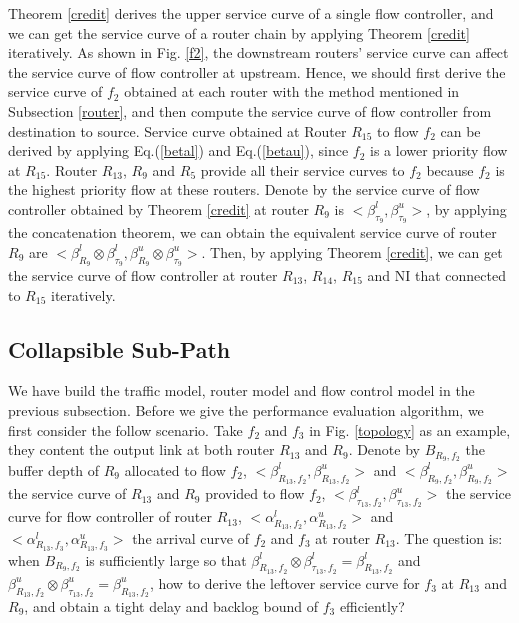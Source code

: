 \documentclass[10pt,journal]{IEEEtran}
\begin{document}
Theorem \ref{credit} derives the upper service curve of a single flow controller, and we can get the service curve of a router chain by applying Theorem
\ref{credit} iteratively. As shown in Fig. \ref{f2}, the downstream routers' service curve can affect the service curve of flow controller at upstream. Hence, we should first derive the service curve of $f_2$ obtained at each router with the method mentioned in Subsection \ref{router}, and then compute the service curve of flow controller from destination to source. Service curve obtained at Router $R_{15}$ to flow $f_2$ can be derived by applying Eq.(\ref{betal}) and Eq.(\ref{betau}), since $f_2$ is a lower priority flow at $R_{15}$. Router $R_{13}$, $R_{9}$ and $R_{5}$ provide all their service curves to $f_2$ because $f_2$ is the highest priority flow at these routers. Denote by the service curve of flow controller obtained by Theorem \ref{credit} at router $R_{9}$ is $<\beta_{\tau_9}^l,\beta_{\tau_9}^u>$, by applying the concatenation theorem, we can obtain the equivalent service curve of router $R_{9}$ are $<\beta_{R_9}^l\otimes\beta_{\tau_9}^l,\beta_{R_9}^u\otimes\beta_{\tau_9}^u>$. Then, by applying Theorem \ref{credit}, we can get the service curve of flow controller at router $R_{13}$, $R_{14}$, $R_{15}$ and NI that connected to $R_{15}$ iteratively.

\subsection{Collapsible Sub-Path}
We have build the traffic model, router model and flow control model in the previous subsection. Before we give the performance evaluation algorithm, we first consider the follow scenario. Take $f_2$ and $f_3$ in Fig. \ref{topology} as an example, they content the output link at both router $R_{13}$ and $R_{9}$. Denote by $B_{R_9,f_2}$ the buffer depth of $R_{9}$ allocated to flow $f_2$, $<\beta_{R_{13},f_2}^l,\beta_{R_{13},f_2}^u>$ and $<\beta_{R_{9},f_2}^l,\beta_{R_{9},f_2}^u>$ the service curve of $R_{13}$ and $R_{9}$ provided to flow $f_2$, $<\beta_{\tau_{13},f_2}^l,\beta_{\tau_{13},f_2}^u>$ the service curve for flow controller of router $R_{13}$, $<\alpha_{R_{13},f_2}^l,\alpha_{R_{13},f_2}^u>$ and $<\alpha_{R_{13},f_3}^l,\alpha_{R_{13},f_3}^u>$ the arrival curve of $f_2$ and $f_3$ at router $R_{13}$. The question is: when $B_{R_9,f_2}$ is sufficiently large so that $\beta_{R_{13},f_2}^l\otimes\beta_{\tau_{13},f_2}^l=\beta_{R_{13},f_2}^l$ and $\beta_{R_{13},f_2}^u\otimes\beta_{\tau_{13},f_2}^u=\beta_{R_{13},f_2}^u$, how to derive the leftover service curve for $f_3$ at $R_{13}$ and $R_9$, and obtain a tight delay and backlog bound of $f_3$ efficiently?
\end{document}
